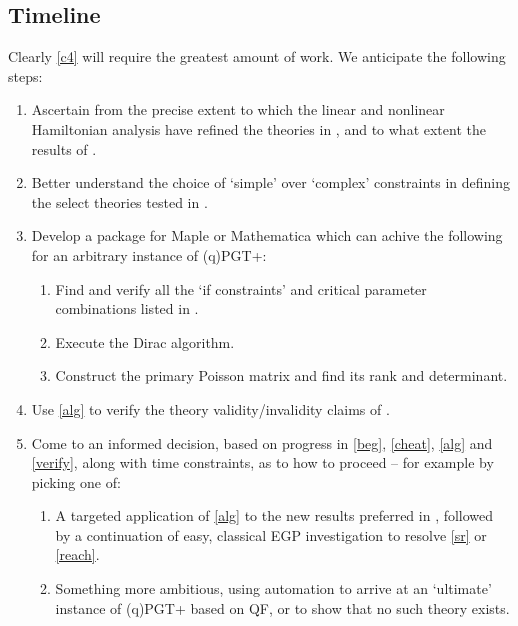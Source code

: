 \documentclass[twoside]{report}
\begin{document}
\begin{multicols}{2}
\subsection{Timeline}
Clearly \ref{c4} will require the greatest amount of work. We anticipate the following steps:
\begin{enumerate}[resume]
  \item\label{beg} Ascertain from \cite{1999IJMPD...8..459Y,2002IJMPD..11..747Y,1987PhRvD..35.3748B} the precise extent to which the linear and nonlinear Hamiltonian analysis have refined the theories in \cite{1980PhRvD..21.3269S}, and to what extent the results of \cite{2019PhRvD..99f4001L,Lin2}.
  \item\label{cheat} Better understand the choice of `simple' over `complex' constraints in defining the select theories tested in \cite{1999IJMPD...8..459Y,2002IJMPD..11..747Y}.
  \item\label{alg} Develop a package for Maple or Mathematica which can achive the following for an arbitrary instance of (q)PGT+:
    \begin{enumerate}
      \item Find and verify all the `if constraints' and critical parameter combinations listed in \cite{1983PhRvD..28.2455B,2002IJMPD..11..747Y}.
      \item Execute the Dirac algorithm.
      \item Construct the primary Poisson matrix and find its rank and determinant.
    \end{enumerate}
  \item\label{verify} Use \ref{alg} to verify the theory validity/invalidity claims of \cite{1999IJMPD...8..459Y,2002IJMPD..11..747Y}.
  \item Come to an informed decision, based on progress in \ref{beg}, \ref{cheat}, \ref{alg} and \ref{verify}, along with time constraints, as to how to proceed -- for example by picking one of:
    \begin{enumerate}
      \item\label{cowardice} A targeted application of \ref{alg} to the new results preferred in \cite{paper-2,2019PhRvD..99f4001L,Lin2}, followed by a continuation of easy, classical EGP investigation to resolve \ref{sr} or \ref{reach}.
      \item\label{bravery} Something more ambitious, using automation to arrive at an `ultimate' instance of (q)PGT+ based on QF, or to show that no such theory exists.
    \end{enumerate}

\end{enumerate}
\end{multicols}
\end{document}
